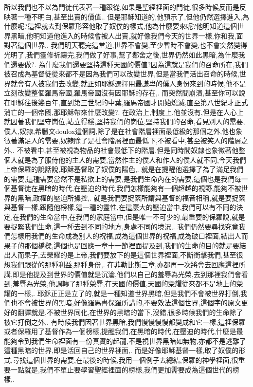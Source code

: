 \documentclass{book}
\begin{document}
所以我們也不以為門徒代表著一種跟從,如果是聖經裡面的門徒,很多時候反而是反映著一種不明白,甚至出賣的價值..
但是耶穌知道的,他預示了,但他仍然選擇進入,為什麼呢?這裡就去到保羅形容他取了奴僕的樣式,他為什麼要來呢?他明知道這個世界黑暗,他明知道他進入的時候會被人出賣,就好像我們今天的世界一樣,你和我,面對著這個世界,.
我們明天聽完這堂道,世界不會變,至少暫時不會變,也不會突然變得光明了,我們靈修祈禱完,我們做了好事,幫了鄰舍之後,世界仍然如此黑暗,為什麼我們還要做?.
為什麼我們還要堅持這種天國的價值?因為這就是我們的召命所在,我們被召成為基督徒從來都不是因為我們可以改變世界,但是當我們活出召命的時候,世界就會有人被我們去改變,就正如耶穌選擇用最謙卑的僕人身份來到的時候,他不是立刻改變整個羅馬帝國,羅馬帝國沒有因耶穌的存在,.
而突然間崩潰,甚至你可以說在耶穌往後幾百年,直到第三世紀的中葉,羅馬帝國才開始熄滅,直至第八世紀才正式消亡的一個帝國,那耶穌帶來什麼改變?.
在政治上,制度上,他並沒有,但是在人心上就因著我們堅守崗位,站立得穩,堅持我們的崗位,堅持我們的召命,看見別人的需要,僕人,奴隸,希臘文doulox這個詞,除了是在社會階層裡面最低級的那個之外,他也象徵著滿足人的需要,奴隸除了是社會階層裡面最低下,不被看中,甚至被笑人的階層之外,.
不被看中,甚至被視為物品的社會最低下的階層,但是同時間奴隸也象徵著他整個人就是為了服侍他的主人的需要,當然作主的僕人和作人的僕人就不同,今天我們上帝保羅的說話說,耶穌基督取了奴僕的陽色,.
就是在提醒他選擇了為了滿足我們的需要,這種需要當然不是私欲上的需要,是我們生命內在的需要,這個也是我們每一個基督徒在黑暗的時代,在壓迫的時代,我們怎樣能夠有一個超越的視野,能夠不被世界的黑暗,政權的壓迫所操控,.
就是我們要捉緊所謂與基督的福音相稱,就是要捉緊與基督一樣,跟隨他榜樣,這一種的靈性,在這麼大的壓迫當中,我們可以有不同的決定,在我們的生命當中,在我們的家庭當中,但是唯一不可少的,最重要的保羅說,就是要捉緊我們生命,這一種去到不同的地方,身處不同的境況,.
我們仍然要尋找究竟我們怎樣用我們的生命成為別人的祝福,成為這個世界的祝福,成為破口裡面,結出人而果子的那個橋樑,這個也是回應一章十一節裡面提及到,我們的生命的目的就是要結出人而果子,去榮耀的是上帝,我們要放下的是這個世界裡面,不斷衝擊我們,甚至很想我們跟從的那種利益,那種身份,.
在菲勒比斯三章,亦都再一次將會去回應這裡所講,即是他提及到世界的價值就是沉淪,他們以自己的羞辱為光榮,去到那裡我們會看到,羞辱為光榮,他調轉了那種榮辱,在天國的價值,天國的榮耀從來都不是地上的榮耀的一樣,.
耶穌正正是立了的,就是一種知道世界黑暗,但是我們不會被世界打倒,我們也不會被世界的黑暗,好像羅馬書保羅所講的,不要效法這個世界,這個字的原文更好的翻譯就是,不被世界同化,在世界的黑暗的當下,沒錯,很多時候我們的生命除了被它打倒之外,.
有時候我們因著世界黑暗,我們慢慢慢慢都變成和它一樣,這裡保羅或者保羅用了基督作為一個榜樣,提醒我們,在黑暗的時代,在壓迫的時代,什麼是最能夠令到我們生命裡面有一份真實的起龍,不是視世界黑暗如無物,亦都不是逃離了這種黑暗的世界,即是活回自己的世界裡面,.
而是好像耶穌基督一樣,取了奴僕的形式,尋找這個世界的需要,在最後的時候,我用一個例子去總結,保羅的神學裡面,很重要一點就是,我們不單止要學習聖經裡面的榜樣,我們更加需要成為這個世代的榜樣,.
\end{document}
